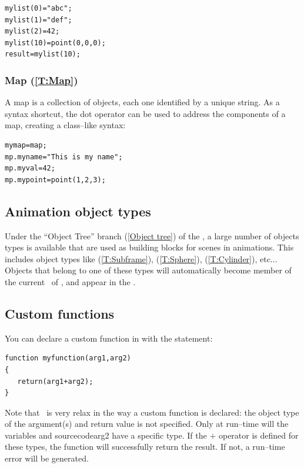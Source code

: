 \begin{lstlisting}
mylist(0)="abc";
mylist(1)="def";
mylist(2)=42;
mylist(10)=point(0,0,0);
result=mylist(10);
\end{lstlisting}

\subsubsection{Map (\ref{T:Map})}
A map is a collection of objects, each one identified by a unique string. As a syntax shortcut, the dot operator can be used to address the components of a map, creating a class--like syntax:

\begin{lstlisting}
mymap=map;
mp.myname="This is my name";
mp.myval=42;
mp.mypoint=point(1,2,3);
\end{lstlisting}

\subsection{Animation object types}
Under the ``Object Tree'' branch (\ref{Object tree}) of the \functionspanel, a large number of objects types is available that are used as building blocks for scenes in animations. This includes object types like  (\ref{T:Subframe}),  (\ref{T:Sphere}),  (\ref{T:Cylinder}), etc... Objects that belong to one of these types will automatically become member of the current \objecttree\ of \softwarename, and appear in the \objectspanel.

\subsection{Custom functions}
You can declare a custom function in \scriptlang with the  statement:

\begin{lstlisting}
function myfunction(arg1,arg2)
{
   return(arg1+arg2);
}
\end{lstlisting}

Note that \scriptlang\ is very relax in the way a custom function is declared: the object type of the argument(s) and return value is not specified. Only at run--time will the variables  and sourcecode{arg2} have a specific type. If the $+$ operator is defined for these types, the function will successfully return the result. If not, a run--time error will be generated.


